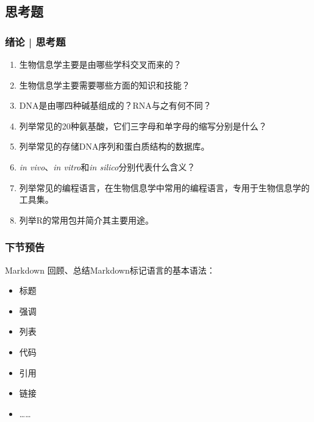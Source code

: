 \subsection{思考题}
\begin{frame}
  \frametitle{绪论 | 思考题}
  \begin{enumerate}
    \item 生物信息学主要是由哪些学科交叉而来的？
    \item 生物信息学主要需要哪些方面的知识和技能？
    \item DNA是由哪四种碱基组成的？RNA与之有何不同？
    \item 列举常见的20种氨基酸，它们三字母和单字母的缩写分别是什么？
    \item 列举常见的存储DNA序列和蛋白质结构的数据库。
    \item \textit{in vivo}、\textit{in vitro}和\textit{in silico}分别代表什么含义？
    \item 列举常见的编程语言，在生物信息学中常用的编程语言，专用于生物信息学的工具集。
    \item 列举R的常用包并简介其主要用途。
  \end{enumerate}
\end{frame}

\begin{frame}
  \frametitle{下节预告}
  \begin{block}{Markdown}
    回顾、总结Markdown标记语言的基本语法：
    \begin{itemize}
      \item 标题
      \item 强调
      \item 列表
      \item 代码
      \item 引用
      \item 链接
      \item ……
    \end{itemize}
  \end{block}
\end{frame}


